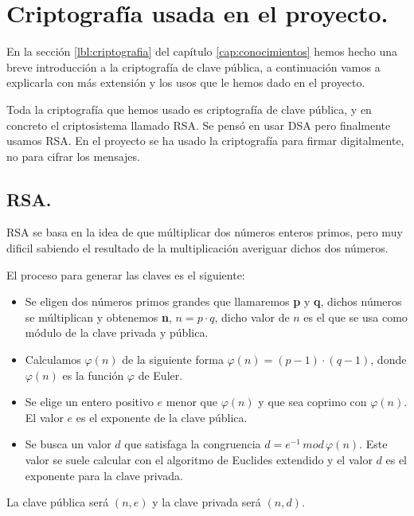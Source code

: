 \chapter{Criptografía usada en el proyecto.}\label{cap:criptografia}

En la sección \ref{lbl:criptografia} del capítulo \ref{cap:conocimientos} hemos hecho una breve introducción a la criptografía de clave pública, a continuación vamos a explicarla con más extensión y los usos que le hemos dado en el proyecto.

Toda la criptografía que hemos usado es criptografía de clave pública, y en concreto el criptosistema llamado RSA. Se pensó en usar DSA pero finalmente usamos RSA. En el proyecto se ha usado la criptografía para firmar digitalmente, no para cifrar los mensajes.

\section{RSA.}

RSA se basa en la idea de que múltiplicar dos números enteros primos, pero muy dificil sabiendo el resultado de la multiplicación averiguar dichos dos números.

El proceso para generar las claves es el siguiente:
\begin{itemize}

	\item Se eligen dos números primos grandes que llamaremos \textbf{p} y \textbf{q}, dichos números se múltiplican y obtenemos \textbf{n}, $n = p \cdot q$, dicho valor de $n$ es el que se usa como módulo de la clave privada y pública. 

	\item Calculamos $\varphi(n)$ de la siguiente forma $\varphi(n)=(p-1)\cdot(q-1)$, donde $\varphi(n)$ es la función $\varphi$ de Euler.

	\item Se elige un entero positivo $e$ menor que $\varphi(n)$ y que sea coprimo con $\varphi(n)$. El valor $e$ es el exponente de la clave pública.
	
	\item Se busca un valor $d$ que satisfaga la congruencia $d=e^{-1}\,mod\,\varphi(n)$. Este valor se suele calcular con el algoritmo de Euclides extendido y el valor $d$ es el exponente para la clave privada. 
\end{itemize}

La clave pública será $(n,e)$ y la clave privada será $(n,d)$.

